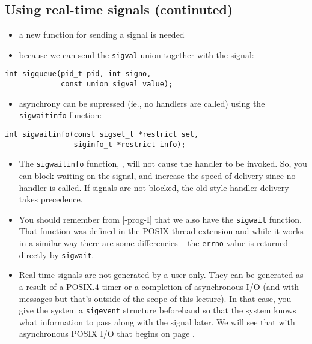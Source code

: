 \subsection{Using real-time signals (continuted)}

\begin{itemize}
\item a new function for sending a signal is needed
\item because we can send the \texttt{sigval} union together with the signal:
\end{itemize}

\begin{verbatim}
int sigqueue(pid_t pid, int signo,
             const union sigval value);
\end{verbatim}

\begin{itemize}
\item asynchrony can be supressed (ie., no handlers are called) using the
\texttt{sigwaitinfo} function:
\end{itemize}

\begin{verbatim}
int sigwaitinfo(const sigset_t *restrict set,
                siginfo_t *restrict info);
\end{verbatim}


\begin{itemize}
\item The \texttt{sigwaitinfo} function, , will not
cause the handler to be invoked. So, you can block waiting on the signal, and
increase the speed of delivery since no handler is called. If signals are not
blocked, the old-style handler delivery takes precedence.
\item You should remember from [\myun\myix-prog-I] that we also have the
\texttt{sigwait} function. That function was defined in the POSIX thread
extension and while it works in a similar way there are some differencies -- the
\texttt{errno} value is returned directly by \texttt{sigwait}.
\item Real-time signals are not generated by a user only. They can be generated
as a result of a POSIX.4 timer or a completion of asynchronous I/O (and with
messages but that's outside of the scope of this lecture). In that case, you
give the system a \texttt{sigevent} structure beforehand so that the system
knows what information to pass along with the signal later. We will see that
with asynchronous POSIX I/O that begins on page \pageref{ASYNCHRONOUS_IO}.
\end{itemize}

